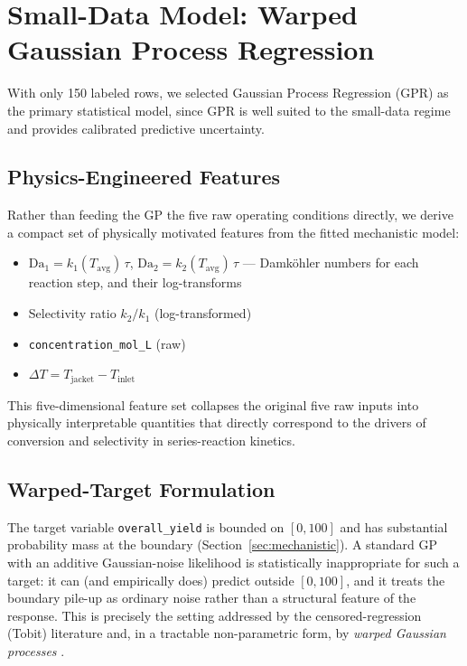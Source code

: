 \documentclass[11pt,a4paper]{article}
\begin{document}
\section{Small-Data Model: Warped Gaussian Process Regression}
\label{sec:gpr}

With only 150 labeled rows, we selected Gaussian Process Regression (GPR) as the primary
statistical model, since GPR is well suited to the small-data regime and provides calibrated
predictive uncertainty.

\subsection{Physics-Engineered Features}

Rather than feeding the GP the five raw operating conditions directly, we derive a compact set of
physically motivated features from the fitted mechanistic model:

\begin{itemize}[nosep]
  \item $\text{Da}_1 = k_1(T_{\text{avg}})\, \tau$, $\text{Da}_2 = k_2(T_{\text{avg}})\, \tau$
  --- Damk\"{o}hler numbers for each reaction step, and their log-transforms
  \item Selectivity ratio $k_2/k_1$ (log-transformed)
  \item \texttt{concentration\_mol\_L} (raw)
  \item $\Delta T = T_{\text{jacket}} - T_{\text{inlet}}$
\end{itemize}

This five-dimensional feature set collapses the original five raw inputs into physically
interpretable quantities that directly correspond to the drivers of conversion and selectivity in
series-reaction kinetics.

\subsection{Warped-Target Formulation}

The target variable \texttt{overall\_yield} is bounded on $[0, 100]$ and has substantial
probability mass at the boundary (Section~\ref{sec:mechanistic}). A standard GP with an additive
Gaussian-noise likelihood is statistically inappropriate for such a target: it can (and empirically
does) predict outside $[0, 100]$, and it treats the boundary pile-up as ordinary noise rather than
a structural feature of the response. This is precisely the setting addressed by the
censored-regression (Tobit) literature and, in a tractable non-parametric form, by
\emph{warped Gaussian processes} \cite{snelson2003warped}.
\end{document}
